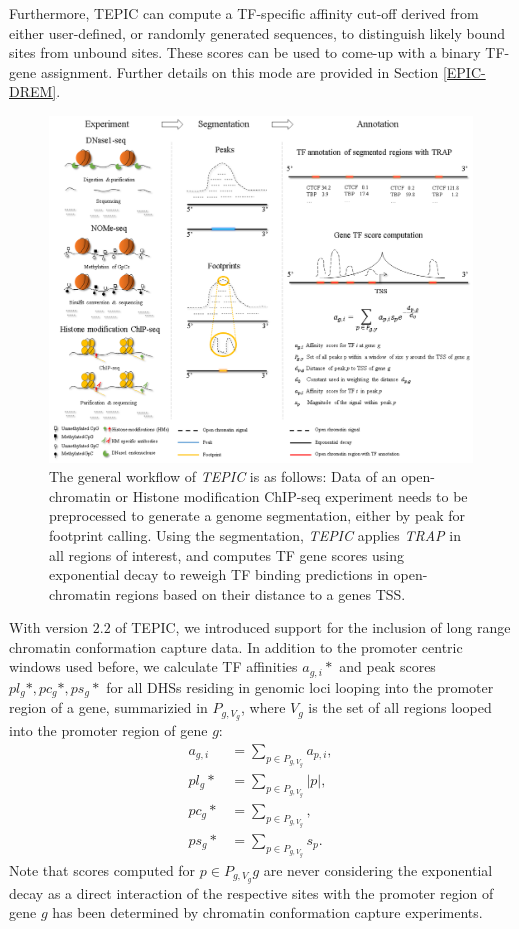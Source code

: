\documentclass{article}
\begin{document}
Furthermore, TEPIC can compute a TF-specific affinity cut-off derived from either user-defined, or randomly generated sequences, to distinguish likely bound sites from unbound sites. These scores
can be used to come-up with a binary TF-gene assignment. Further details on this mode are provided in Section \ref{EPIC-DREM}.
\begin{figure}[h!]
\begin{center}
\includegraphics[width=\textwidth]{Workflow.png}
\end{center}
\caption{The general workflow of \textit{TEPIC} is as follows: 
Data of an open-chromatin or Histone modification ChIP-seq experiment needs to be preprocessed to generate a genome segmentation, 
either by peak for footprint calling. 
Using the segmentation, \textit{TEPIC} applies \textit{TRAP} in all regions of interest, and computes TF gene scores using exponential decay to reweigh 
TF binding predictions in open-chromatin regions based on their distance to a genes TSS.} 
\label{workflowFig}
\end{figure}

With version $2.2$ of TEPIC, we introduced support for the inclusion of long range chromatin conformation capture data. In addition to the promoter centric windows used before, we
calculate TF affinities $a_{g,i}*$ and peak scores $pl_g*, pc_g*, ps_g*$ for all DHSs residing  in genomic loci looping into the promoter region of a gene, summarizied in $P_{g,V_g}$, where $V_g$ is the set of all regions looped into the promoter region of gene $g$:
\begin{align}
a_{g,i}&=\sum_{p \in P_{g,V_g}} a_{p,i},\\
pl_g*&=\sum_{p \in P_{g,V_g}}|p|, \\
pc_g*&=\sum_{p \in P_{g,V_g}}, \\
ps_g*&=\sum_{p \in P_{g,V_g}}s_{p}.
\end{align}
Note that scores computed for $p \in P_{g,V_g}g$ are never considering the exponential decay as a direct interaction of the respective sites with the promoter region of gene $g$ has been determined by chromatin conformation capture experiments.
\end{document}
